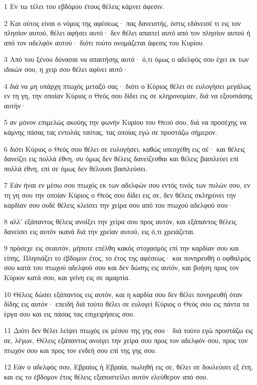 \par 1 Εν τω τέλει του εβδόμου έτους θέλεις κάμνει άφεσιν.
\par 2 Και ούτος είναι ο νόμος της αφέσεως· πας δανειστής, όστις εδάνεισέ τι εις τον πλησίον αυτού, θέλει αφήσει αυτό· δεν θέλει απαιτεί αυτό από τον πλησίον αυτού ή από τον αδελφόν αυτού· διότι τούτο ονομάζεται άφεσις του Κυρίου.
\par 3 Από του ξένου δύνασαι να απαιτήσης αυτό· ό,τι όμως ο αδελφός σου έχει εκ των ιδικών σου, η χειρ σου θέλει αφίνει αυτό·
\par 4 διά να μη υπάρχη πτωχός μεταξύ σας· διότι ο Κύριος θέλει σε ευλογήσει μεγάλως εν τη γη, την οποίαν Κύριος ο Θεός σου δίδει εις σε κληρονομίαν, διά να εξουσιάσης αυτήν·
\par 5 αν μόνον επιμελώς ακούης την φωνήν Κυρίου του Θεού σου, διά να προσέχης να κάμνης πάσας τας εντολάς ταύτας, τας οποίας εγώ σε προστάζω σήμερον.
\par 6 διότι Κύριος ο Θεός σου θέλει σε ευλογήσει, καθώς υπεσχέθη εις σέ· και θέλεις δανείζει εις πολλά έθνη, συ όμως δεν θέλεις δανείζεσθαι και θέλεις βασιλεύει επί πολλά έθνη, επί σε όμως δεν θέλουσι βασιλεύσει.
\par 7 Εάν ήναι εν μέσω σου πτωχός εκ των αδελφών σου εντός τινός των πυλών σου, εν τη γη σου την οποίαν Κύριος ο Θεός σου δίδει εις σε, δεν θέλεις σκληρύνει την καρδίαν σου ουδέ θέλεις κλείσει την χείρα σου από του πτωχού αδελφού σου·
\par 8 αλλ' εξάπαντος θέλεις ανοίξει την χείρα σου προς αυτόν, και εξάπαντος θέλεις δανείσει εις αυτόν ικανά διά την χρείαν αυτού, εις ό,τι χρειάζεται.
\par 9 πρόσεχε εις σεαυτόν, μήποτε επέλθη κακός στοχασμός επί την καρδίαν σου και είπης, Πλησιάζει το έβδομον έτος, το έτος της αφέσεως· και πονηρευθή ο οφθαλμός σου κατά του πτωχού αδελφού σου και δεν δώσης εις αυτόν, και βοήση προς τον Κύριον κατά σου, και γείνη εις σε αμαρτία.
\par 10 Θέλεις δώσει εξάπαντος εις αυτόν, και η καρδία σου δεν θέλει πονηρευθή όταν δίδης εις αυτόν· επειδή διά τούτο θέλει σε ευλογεί Κύριος ο Θεός σου εις πάντα τα έργα σου και εις πάσας τας επιχειρήσεις σου.
\par 11 Διότι δεν θέλει λείψει πτωχός εκ μέσου της γης σου· διά τούτο εγώ προστάζω εις σε, λέγων, Θέλεις εξάπαντος ανοίγει την χείρα σου προς τον αδελφόν σου, προς τον πτωχόν σου και προς τον ενδεή σου επί της γης σου.
\par 12 Εάν ο αδελφός σου, Εβραίος ή Εβραία, πωληθή εις σε, θέλει σε δουλεύσει εξ έτη, και εις το έβδομον έτος θέλεις εξαποστείλει αυτόν ελεύθερον από σου.
